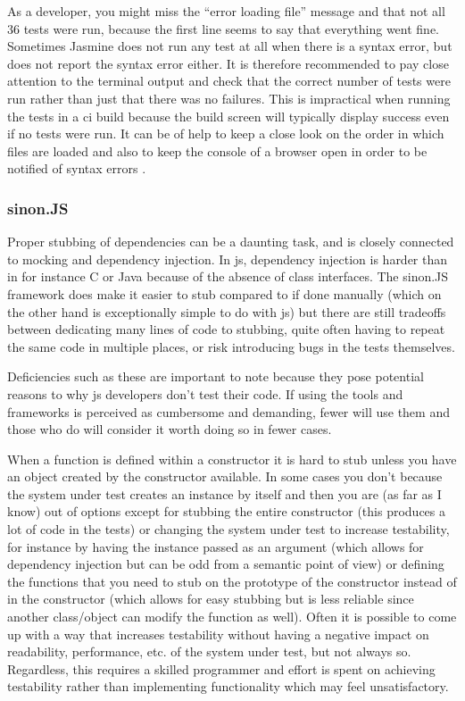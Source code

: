 \documentclass[11pt]{article}
\begin{document}
As a developer, you might miss the ``error loading file'' message and that not all 36 tests were run, because the first line seems to say that everything went fine. Sometimes Jasmine does not run any test at all when there is a syntax error, but does not report the syntax error either. It is therefore recommended to pay close attention to the terminal output and check that the correct number of tests were run rather than just that there was no failures. This is impractical when running the tests in a \gls{ci} build because the build screen will typically display success even if no tests were run. It can be of help to keep a close look on the order in which files are loaded and also to keep the console of a browser open in order to be notified of syntax errors \cite{MikeJansen}.

\subsubsection{sinon.JS}

Proper stubbing of dependencies can be a daunting task, and is closely connected to mocking and dependency injection. In \gls{js}, dependency injection is harder than in for instance C or Java because of the absence of class interfaces. The sinon.JS framework does make it easier to stub compared to if done manually (which on the other hand is exceptionally simple to do with \gls{js}) but there are still tradeoffs between dedicating many lines of code to stubbing, quite often having to repeat the same code in multiple places, or risk introducing bugs in the tests themselves.

Deficiencies such as these are important to note because they pose potential reasons to why \gls{js} developers don't test their code. If using the tools and frameworks is perceived as cumbersome and demanding, fewer will use them and those who do will consider it worth doing so in fewer cases.

When a function is defined within a constructor it is hard to stub unless you have an object created by the constructor available. In some cases you don't because the system under test creates an instance by itself and then you are (as far as I know) out of options except for stubbing the entire constructor (this produces a lot of code in the tests) or changing the system under test to increase testability, for instance by having the instance passed as an argument (which allows for dependency injection but can be odd from a semantic point of view) or defining the functions that you need to stub on the prototype of the constructor instead of in the constructor (which allows for easy stubbing but is less reliable since another class/object can modify the function as well). Often it is possible to come up with a way that increases testability without having a negative impact on readability, performance, etc. of the system under test, but not always so. Regardless, this requires a skilled programmer and effort is spent on achieving testability rather than implementing functionality which may feel unsatisfactory.
\end{document}
